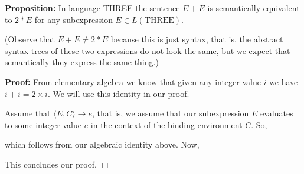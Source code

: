 \documentclass[a4paper,blends,pdf,colorBG,slideColor]{prosper}
\begin{document}
{\bf Proposition:} In  language THREE
 the sentence $E + E$ is semantically
equivalent to $2 * E$ for any subexpression $E\in L(\mbox{THREE})$.

(Observe that $E + E \ne 2 *E$ because this is just syntax, that is,
the abstract syntax trees of these two expressions do not look the same, but we 
expect that semantically they express the  same thing.)

{\bf Proof:} From elementary algebra we know that given any integer value $i$ we
have $i + i = 2 \times i$.  We will use this identity in our proof.

Assume that $\langle E, C \rangle \rightarrow e$, that is, we assume that our 
subexpression $E$ evaluates to some integer value $e$ in the context of the
binding environment $C$. So,
\begin{prooftree}
\end{prooftree}
which follows from our algebraic identity above. Now,
\begin{prooftree}
\end{prooftree}
This concludes our proof. $\Box$



\es
\end{document}
